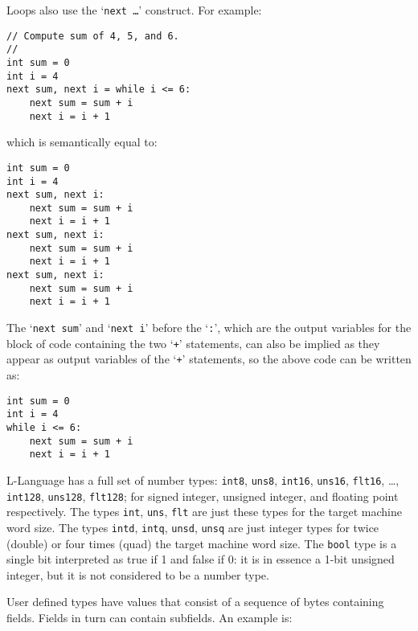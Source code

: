 \documentclass[12pt]{article}
\newenvironment{indpar}[1][0.3in]%
	{\begin{list}{}%
		     {\setlength{\itemsep}{0in}%
		      \setlength{\topsep}{0in}%
		      \setlength{\parsep}{1ex}%
		      \setlength{\labelwidth}{#1}%
		      \setlength{\leftmargin}{#1}%
		      \addtolength{\leftmargin}{\labelsep}}%
	 \item}%
	{\end{list}}
\begin{document}
Loops also use the `{\tt next \ldots}' construct.  For example:
\begin{indpar}\begin{verbatim}
// Compute sum of 4, 5, and 6.
//
int sum = 0
int i = 4
next sum, next i = while i <= 6:
    next sum = sum + i
    next i = i + 1
\end{verbatim}\end{indpar}
which is semantically equal to:
\begin{indpar}\begin{verbatim}
int sum = 0
int i = 4
next sum, next i:
    next sum = sum + i
    next i = i + 1
next sum, next i:
    next sum = sum + i
    next i = i + 1
next sum, next i:
    next sum = sum + i
    next i = i + 1
\end{verbatim}\end{indpar}
The `{\tt next sum}' and `{\tt next i}' before the `{\tt :}',
which are the output variables for the block of code containing
the two `{\tt +}' statements,
can also be implied as they appear as output variables
of the `{\tt +}' statements, so the above code can be written as:
\begin{indpar}\begin{verbatim}
int sum = 0
int i = 4
while i <= 6:
    next sum = sum + i
    next i = i + 1
\end{verbatim}\end{indpar}

L-Language has a full set of number types:
{\tt int8}, {\tt uns8},
{\tt int16}, {\tt uns16}, {\tt flt16}, \ldots,
{\tt int128}, {\tt uns128}, {\tt flt128}; for signed integer,
unsigned integer, and floating point respectively.
The types {\tt int}, {\tt uns}, {\tt flt} are just these
types for the target machine word size.
The types {\tt intd}, {\tt intq}, {\tt unsd}, {\tt unsq} are just integer
types for twice (double) or four times (quad) the target machine word size.
The {\tt bool} type is a single bit interpreted as true if
1 and false if 0: it is in essence a 1-bit unsigned integer, but it
is not considered to be a number type.

User defined types have values that
consist of a sequence of bytes containing fields.
Fields in turn can contain subfields.
An example is:
\end{document}
